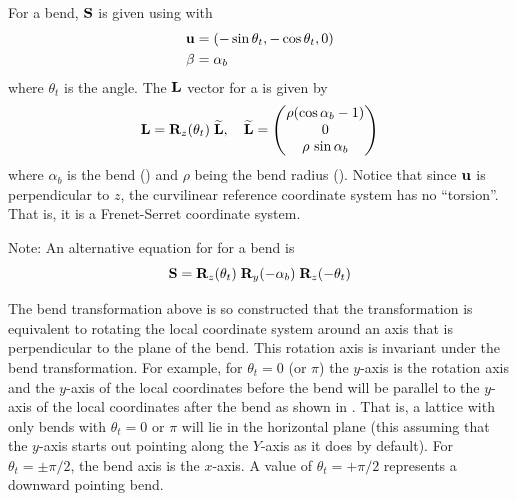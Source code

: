 For a bend, ${\bf S}$ is given using  with 
\begin{align}
  {\bf u} &= (-\sin\theta_t, -\cos\theta_t, 0) \nonumber \\
  \beta &= \alpha_b
  \label{ustt}
\end{align}
where $\theta_t$ is the  angle. The ${\bf L}$ vector for a  is given by 
\begin{equation}
  {\bf L} = {\bf R}_{z}(\theta_t) \; {\widetilde{\bf L}}, \quad
  {\widetilde{\bf L}} = 
  \begin{pmatrix}
    \rho (\cos\alpha_b - 1) \\ 0 \\ \rho \, \sin\alpha_b
  \end{pmatrix}
  \label{lrztt}
\end{equation}
where $\alpha_b$ is the bend  () and $\rho$ being the bend radius
(). Notice that since ${\bf u}$ is perpendicular to $z$, the curvilinear reference coordinate
system has no ``torsion''. That is, it is a Frenet-Serret coordinate system.

Note: An alternative equation for \vn{\bfS} for a bend is
 \begin{equation}
  {\bf S} = {\bf R}_{z}(\theta_t) \; {\bf R}_{y}(-\alpha_b) \; {\bf R}_{z}(-\theta_t)
  \label{srrr}
\end{equation}

The bend transformation above is so constructed that the transformation is equivalent to rotating
the local coordinate system around an axis that is perpendicular to the plane of the bend. This
rotation axis is invariant under the bend transformation. For example, for $\theta_t = 0$ (or $\pi$)
the $y$-axis is the rotation axis and the $y$-axis of the local coordinates before the bend will be
parallel to the $y$-axis of the local coordinates after the bend as shown in . That
is, a lattice with only bends with $\theta_t = 0$ or $\pi$ will lie in the horizontal plane (this
assuming that the $y$-axis starts out pointing along the $Y$-axis as it does by default).  For
$\theta_t = \pm\pi/2$, the bend axis is the $x$-axis. A value of $\theta_t = +\pi/2$ represents a
downward pointing bend.

